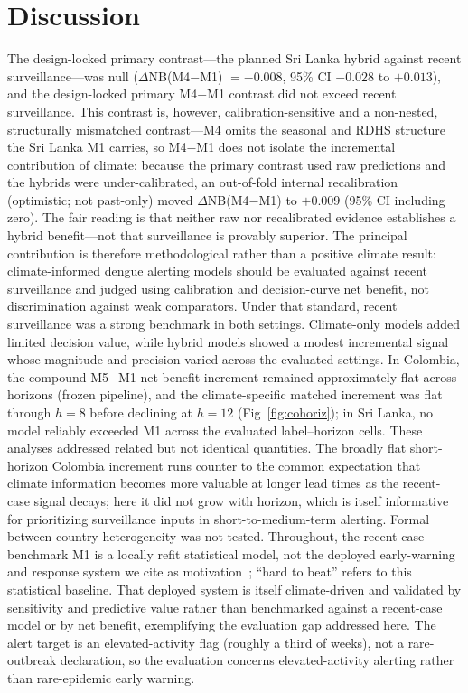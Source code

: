 \documentclass[11pt,a4paper]{article}
\begin{document}
\section{Discussion}

The design-locked primary contrast---the planned Sri Lanka hybrid against recent surveillance---was null ($\Delta$NB(M4$-$M1) $=-0.008$, 95\% CI $-0.028$ to $+0.013$), and the design-locked primary M4$-$M1 contrast did not exceed recent surveillance. This contrast is, however, calibration-sensitive and a non-nested, structurally mismatched contrast---M4 omits the seasonal and RDHS structure the Sri Lanka M1 carries, so M4$-$M1 does not isolate the incremental contribution of climate: because the primary contrast used raw predictions and the hybrids were under-calibrated, an out-of-fold internal recalibration (optimistic; not past-only) moved $\Delta$NB(M4$-$M1) to $+0.009$ (95\% CI including zero). The fair reading is that neither raw nor recalibrated evidence establishes a hybrid benefit---not that surveillance is provably superior. The principal contribution is therefore methodological rather than a positive climate result: climate-informed dengue alerting models should be evaluated against recent surveillance and judged using calibration and decision-curve net benefit, not discrimination against weak comparators. Under that standard, recent surveillance was a strong benchmark in both settings. Climate-only models added limited decision value, while hybrid models showed a modest incremental signal whose magnitude and precision varied across the evaluated settings. In Colombia, the compound M5$-$M1 net-benefit increment remained approximately flat across horizons (frozen pipeline), and the climate-specific matched increment was flat through $h=8$ before declining at $h=12$ (Fig~\ref{fig:cohoriz}); in Sri Lanka, no model reliably exceeded M1 across the evaluated label--horizon cells. These analyses addressed related but not identical quantities. The broadly flat short-horizon Colombia increment runs counter to the common expectation that climate information becomes more valuable at longer lead times as the recent-case signal decays; here it did not grow with horizon, which is itself informative for prioritizing surveillance inputs in short-to-medium-term alerting. Formal between-country heterogeneity was not tested. Throughout, the recent-case benchmark M1 is a locally refit statistical model, not the deployed early-warning and response system we cite as motivation~\cite{EWARScsd}; ``hard to beat'' refers to this statistical baseline. That deployed system is itself climate-driven and validated by sensitivity and predictive value rather than benchmarked against a recent-case model or by net benefit, exemplifying the evaluation gap addressed here. The alert target is an elevated-activity flag (roughly a third of weeks), not a rare-outbreak declaration, so the evaluation concerns elevated-activity alerting rather than rare-epidemic early warning.
\end{document}
